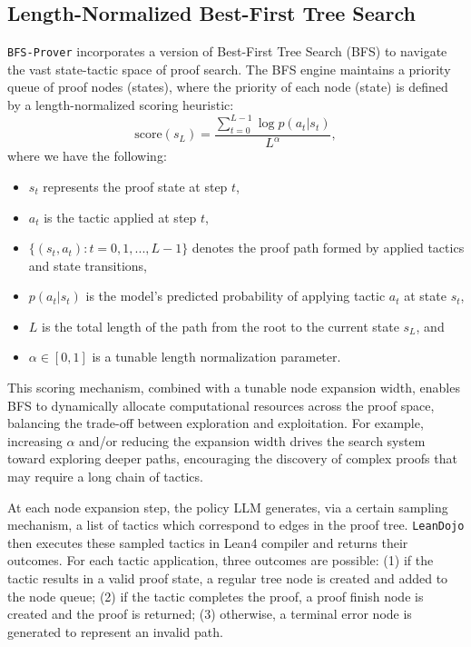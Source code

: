 \documentclass[10pt,english]{article}
\begin{document}
\subsection{Length-Normalized Best-First Tree Search}
\texttt{BFS-Prover} incorporates a version of Best-First Tree Search (BFS) to navigate the vast state-tactic space of proof search. The BFS engine maintains a priority queue of proof nodes (states), where the priority of each node (state) is defined
by a length-normalized scoring heuristic:
\begin{equation}\label{eq:len_norm}
\text{score}(s_L) = \frac{\sum_{t=0}^{L-1} \log p(a_t | s_t)}{L^\alpha},    
\end{equation}
where we have the following:
\begin{itemize}
    \item \(s_t\) represents the proof state at step \(t\),
    \item \(a_t\) is the tactic applied at step \(t\),
    \item $\{(s_t, a_t): t = 0, 1, ..., L-1\}$ denotes the proof path formed by applied tactics and state transitions,
    \item \(p(a_t | s_t)\) is the model’s predicted probability of applying tactic \(a_t\) at state \(s_t\),
    \item \(L\) is the total length of the path from the root to the current state \(s_L\), and
    \item \(\alpha \in [0, 1]\) is a tunable length normalization parameter.
\end{itemize}

This scoring mechanism, combined with a tunable node expansion width, enables BFS to dynamically allocate computational resources across the proof space, balancing the trade-off between exploration and exploitation. For example, increasing \(\alpha\) and/or reducing the expansion width drives the search system toward exploring deeper paths, encouraging the discovery of complex proofs that may require a long chain of tactics. 

At each node expansion step, the policy LLM generates, via a certain sampling mechanism, a list of tactics which correspond to edges in the proof tree. \texttt{LeanDojo} then executes these sampled tactics in Lean4 compiler and returns their outcomes. For each tactic application, three outcomes are possible: (1) if the tactic results in a valid proof state, a regular tree node is created and added to the node queue; (2) if the tactic completes the proof, a proof finish node is created and the proof is returned; (3) otherwise, a terminal error node is generated to represent an invalid path.
\end{document}

